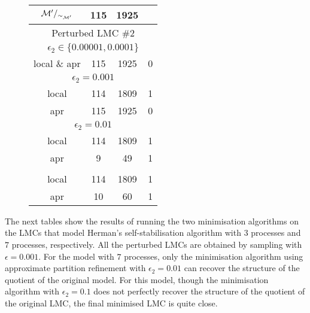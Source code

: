 \begin{figure}[h!]
\begin{floatrow}
{\begin{tabular}{|c|c|c|c|}
		$\mathcal{M}'/_{\sim_{\mathcal{M}'}}$      & 		115  &	       1925            & \\
		\hline
		\multicolumn{4}{|c|}{Perturbed LMC \#2}\\ 
		\hline
		\multicolumn{4}{|c|}{$\epsilon_2 \in\{ 0.00001,  0.0001\}$}\\
		\hline
		local \& apr      & 115 & 1925 & 0  \\
		\hline
		\multicolumn{4}{|c|}{$\epsilon_2 = 0.001$}\\
		\hline
		local      & 114 & 1809 & 1  \\
		apr		  & 115 & 1925 & 0  \\
		\hline
		\multicolumn{4}{|c|}{$\epsilon_2 = 0.01$}\\
		\hline
		local      & 114 & 1809 & 1  \\
		\rowcolor{yellow}
		apr		  & 9 & 49 & 1  \\
		\rowcolor{white}
		\hline		
		\multicolumn{4}{|c|}{$\epsilon_2 = 0.1$}\\
		\hline
		local      & 114 & 1809 & 1  \\
		\rowcolor{red!40}
		apr		  & 10 & 60 & 1  \\
		\hline
	\end{tabular}	
	}{}
\end{floatrow}
\end{figure}
The next tables show the results of running the two minimisation algorithms on the LMCs that model Herman's self-stabilisation algorithm with $3$ processes and $7$ processes, respectively. All the perturbed LMCs are obtained by sampling with $\epsilon = 0.001$. For the model with $7$ processes, only the minimisation algorithm using approximate partition refinement with $\epsilon_2 = 0.01$ can recover the structure of the quotient of the original model. For this model,  though the minimisation algorithm with $\epsilon_2 = 0.1$ does not perfectly recover the structure of the quotient of the original LMC, the final minimised LMC is quite close. 


